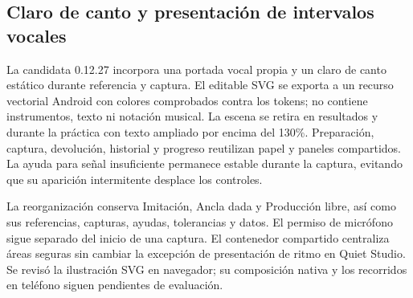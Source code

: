 \subsection{Claro de canto y presentación de intervalos vocales}
La candidata 0.12.27 incorpora una portada vocal propia y un claro de canto
estático durante referencia y captura. El editable SVG se exporta a un recurso
vectorial Android con colores comprobados contra los tokens; no contiene
instrumentos, texto ni notación musical. La escena se retira en resultados y
durante la práctica con texto ampliado por encima del 130\%. Preparación,
captura, devolución, historial y progreso reutilizan papel y paneles compartidos.
La ayuda para señal insuficiente permanece estable durante la captura, evitando
que su aparición intermitente desplace los controles.

La reorganización conserva Imitación, Ancla dada y Producción libre, así como
sus referencias, capturas, ayudas, tolerancias y datos. El permiso de micrófono
sigue separado del inicio de una captura. El contenedor compartido centraliza
áreas seguras sin cambiar la excepción de presentación de ritmo en Quiet Studio.
Se revisó la ilustración SVG en navegador; su composición nativa y los recorridos
en teléfono siguen pendientes de evaluación.
